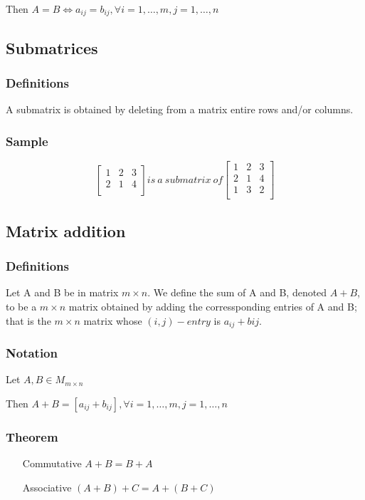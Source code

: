 \documentclass[12pt]{article}
\begin{document}
Then $A = B \Longleftrightarrow a_{ij} = b_{ij}, \forall i=1, \ldots ,m, j=1, \ldots ,n$

\subsection{Submatrices}
\subsubsection{Definitions}
A submatrix is obtained by deleting from a matrix entire rows and/or columns.\\
\subsubsection{Sample}
\begin{equation}
	\left[
	\begin{array}{ccc}
	1 & 2 & 3 \\
	2 & 1 & 4 \\
	\end{array}
	\right]
	is\ a\ submatrix\ of
	\left[
	\begin{array}{ccc}
	1 & 2 & 3 \\
	2 & 1 & 4 \\
	1 & 3 & 2 \\
	\end{array}
	\right]
\end{equation}

\subsection{Matrix addition}
\subsubsection{Definitions}
Let A and B be in matrix $m \times n$. We define the sum of A and B, denoted $A+B$, to be a $m \times n$ matrix obtained by adding the corressponding entries of A and B; that is the $m \times n$ matrix whose $(i,j)-entry$ is $a_{ij}+b{ij}$.
\subsubsection{Notation}
Let $A,B \in M_{m \times n}$

Then $A+B=[a_{ij}+b_{ij}], \forall i=1, \ldots ,m, j=1, \ldots ,n$
\subsubsection{Theorem}
\begin{enumerate}
\item[Commutative] $A+B=B+A$
\item[Associative] $(A+B)+C=A+(B+C)$
\end{enumerate}
\end{document}
